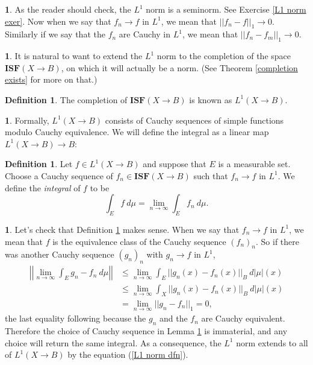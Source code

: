 \documentclass[12pt]{book}
\newcommand{\ISF}{\mathbf{ISF}}
\newcommand{\dfn}[1]{\emph{#1}\index{#1}}
\theoremstyle{definition}
\newtheorem{subsec}[theorem]{}
\newtheorem{definition}[theorem]{Definition}
\begin{document}
\begin{subsec}
As the reader should check, the $L^1$ norm is a seminorm. See Exercise \ref{L1 norm exer}.
Now when we say that $f_n \to f$ in $L^1$, we mean that $||f_n - f||_1 \to 0$. Similarly if we say that the $f_n$ are Cauchy in $L^1$, we mean that $||f_n - f_m||_1 \to 0$.
\end{subsec}

\begin{subsec}
It is natural to want to extend the $L^1$ norm to the completion of the space $\ISF(X \to B)$, on which it will actually be a norm.
(See Theorem \ref{completion exists} for more on that.)
\end{subsec}

\begin{definition}
The completion of $\ISF(X \to B)$ is known as $L^1(X \to B)$.
\end{definition}

\begin{subsec}
Formally, $L^1(X \to B)$ consists of Cauchy sequences of simple functions modulo Cauchy equivalence.
We will define the integral as a linear map $L^1(X \to B) \to B$:
\end{subsec}

\begin{definition}
\label{definition of integral}
Let $f \in L^1(X \to B)$ and suppose that $E$ is a measurable set.
Choose a Cauchy sequence of $f_n \in \ISF(X \to B)$ such that $f_n \to f$ in $L^1$.
We define the \dfn{integral} of $f$ to be
$$\int_E f~d\mu = \lim_{n \to \infty} \int_E f_n~d\mu.$$
\end{definition}

\begin{subsec}
Let's check that Definition \ref{definition of integral} makes sense. When we say that $f_n \to f$ in $L^1$, we mean that $f$ is the equivalence class of the Cauchy sequence $(f_n)_n$.
So if there was another Cauchy sequence $(g_n)_n$ with $g_n \to f$ in $L^1$,
\begin{align*}\left|\left|\lim_{n \to \infty} \int_E g_n - f_n ~d\mu\right|\right| &\leq \lim_{n \to \infty} \int_E ||g_n(x) - f_n(x)||_B ~d|\mu|(x)\\&
\leq \lim_{n \to \infty} \int_X ||g_n(x) - f_n(x)||_B ~d|\mu|(x)
\\& = \lim_{n \to \infty} ||g_n - f_n||_1 = 0,
\end{align*}
the last equality following because the $g_n$ and the $f_n$ are Cauchy equivalent.
Therefore the choice of Cauchy sequence in Lemma \ref{definition of integral} is immaterial, and any choice will return the same integral.
As a consequence, the $L^1$ norm extends to all of $L^1(X \to B)$ by the equation (\ref{L1 norm dfn}).
\end{subsec}
\end{document}
